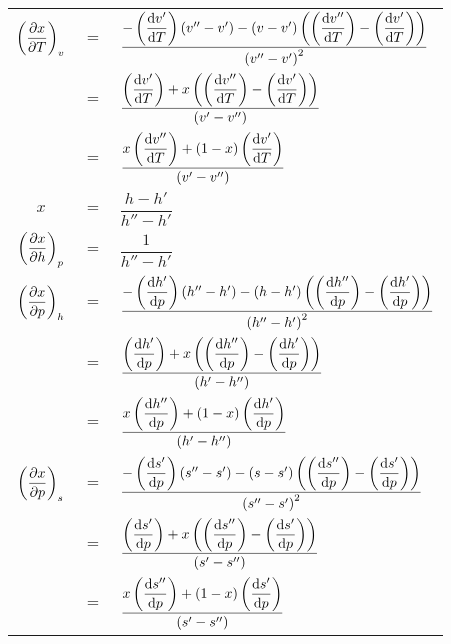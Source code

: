 {\setlength{\tabcolsep}{.2em}
\begin{tabularx}{\linewidth}{ccl}
\toprule
$\der{x}{T}{v}$ 
	& $=$ & $\dfrac{-\DER{v'}{T}\left(v''-v'\right) - \left(v-v'\right)\left(\DER{v''}{T}-\DER{v'}{T}\right)}{\left(v''-v'\right)^2}$\\[15pt]
	& $=$ & $\dfrac{ \DER{v'}{T}+x\left(\DER{v''}{T}-\DER{v'}{T}\right)}{\left(v'-v''\right)}$\\[15pt]
	& $=$ & $\dfrac{x\DER{v''}{T}+\left(1-x\right)\DER{v'}{T}}{\left(v'-v''\right)}$ \\[15pt]
%
\midrule
$x$ 	& $=$ & $\dfrac{h-h'}{h''-h'}$ \\[15pt]
$\der{x}{h}{p}$ 
	& $=$ & $\dfrac{1}{h''-h'}$\\[15pt]
$\der{x}{p}{h}$ 
	& $=$ & $\dfrac{-\DER{h'}{p}\left(h''-h'\right) - \left(h-h'\right)\left(\DER{h''}{p}-\DER{h'}{p}\right)}{\left(h''-h'\right)^2}$\\[15pt]
	& $=$ & $\dfrac{\DER{h'}{p}+x\left(\DER{h''}{p}-\DER{h'}{p}\right)}{\left(h'-h''\right)}$\\[15pt]
	& $=$ & $\dfrac{x\DER{h''}{p}+\left(1-x\right)\DER{h'}{p}}{\left(h'-h''\right)}$\\[15pt]
\midrule
$\der{x}{p}{s}$ 
	& $=$ & $\dfrac{-\DER{s'}{p}\left(s''-s'\right) - \left(s-s'\right)\left(\DER{s''}{p}-\DER{s'}{p}\right)}{\left(s''-s'\right)^2}$\\[15pt]
	& $=$ & $\dfrac{\DER{s'}{p}+x\left(\DER{s''}{p}-\DER{s'}{p}\right)}{\left(s'-s''\right)}$\\[15pt]
	& $=$ & $\dfrac{x\DER{s''}{p}+\left(1-x\right)\DER{s'}{p}}{\left(s'-s''\right)}$\\[15pt]
%
\bottomrule
\end{tabularx}%
}